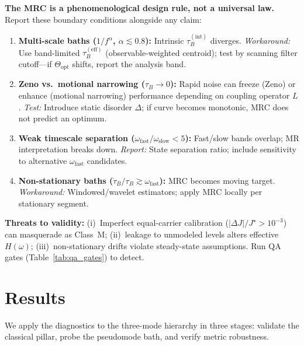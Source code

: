 \documentclass[11pt,letterpaper]{article}
\begin{document}
\begin{tcolorbox}[colback=red!5!white,colframe=red!60!black,title=Boundary Conditions: When MRC Fails or Requires Modification]

\textbf{The MRC is a phenomenological design rule, not a universal law.} Report these boundary conditions alongside any claim:

\begin{enumerate}[leftmargin=*,noitemsep,topsep=2pt]
\item \textbf{Multi-scale baths ($1/f^\alpha$, $\alpha\lesssim 0.8$):} Intrinsic $\tau_B^{(\mathrm{int})}$ diverges. \emph{Workaround:} Use band-limited $\tau_B^{(\mathrm{eff})}$ (observable-weighted centroid); test by scanning filter cutoff—if $\Theta_{\mathrm{opt}}$ shifts, report the analysis band.

\item \textbf{Zeno vs.\ motional narrowing ($\tau_B\to 0$):} Rapid noise can freeze (Zeno) or enhance (motional narrowing) performance depending on coupling operator $L$. \emph{Test:} Introduce static disorder $\Delta$; if curve becomes monotonic, MRC does not predict an optimum.

\item \textbf{Weak timescale separation ($\omega_{\mathrm{fast}}/\omega_{\mathrm{slow}} < 5$):} Fast/slow bands overlap; MR interpretation breaks down. \emph{Report:} State separation ratio; include sensitivity to alternative $\omega_{\mathrm{fast}}$ candidates.

\item \textbf{Non-stationary baths ($\dot\tau_B/\tau_B \gtrsim \omega_{\mathrm{fast}}$):} MRC becomes moving target. \emph{Workaround:} Windowed/wavelet estimators; apply MRC locally per stationary segment.
\end{enumerate}

\textbf{Threats to validity:} (i)~Imperfect equal-carrier calibration ($|\Delta J|/J^\star > 10^{-3}$) can masquerade as Class~M; (ii)~leakage to unmodeled levels alters effective $H(\omega)$; (iii)~non-stationary drifts violate steady-state assumptions. Run QA gates (Table~\ref{tab:qa_gates}) to detect.

\end{tcolorbox}

\clearpage
\section{Results}
\label{sec:results}
We apply the diagnostics to the three-mode hierarchy in three stages: validate the classical pillar, probe the pseudomode bath, and verify metric robustness.
\end{document}
